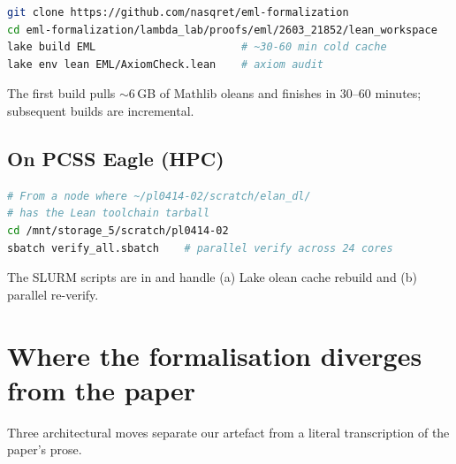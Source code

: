 \documentclass[11pt,a4paper]{article}
\theoremstyle{plain}
\theoremstyle{definition}
\begin{document}
\begin{lstlisting}[language=bash, basicstyle=\ttfamily\small]
git clone https://github.com/nasqret/eml-formalization
cd eml-formalization/lambda_lab/proofs/eml/2603_21852/lean_workspace
lake build EML                       # ~30-60 min cold cache
lake env lean EML/AxiomCheck.lean    # axiom audit
\end{lstlisting}

\noindent
The first build pulls $\sim 6$\,GB of Mathlib oleans and finishes in
$30$--$60$ minutes; subsequent builds are incremental.

\subsection{On PCSS Eagle (HPC)}

\begin{lstlisting}[language=bash, basicstyle=\ttfamily\small]
# From a node where ~/pl0414-02/scratch/elan_dl/
# has the Lean toolchain tarball
cd /mnt/storage_5/scratch/pl0414-02
sbatch verify_all.sbatch    # parallel verify across 24 cores
\end{lstlisting}

\noindent
The SLURM scripts are in  and handle (a) Lake
olean cache rebuild and (b) parallel re-verify.

\section{Where the formalisation diverges from the paper}\label{sec:diverge}

Three architectural moves separate our artefact from a literal
transcription of the paper's prose.
\end{document}

